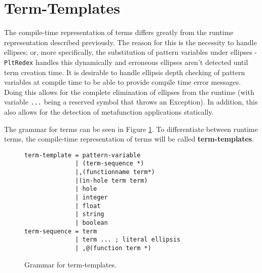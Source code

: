 \section{Term-Templates}
\label{section:term-templates}

The compile-time representation of terms differs greatly from the runtime representation described previously. The reason for this is the necessity to handle ellipses; or, more specifically, the substitution of pattern variables under ellipses - \texttt{PltRedex} handles this dynamically and erroneous ellipses aren't detected until term creation time.
It is desirable to handle ellipsis depth checking of pattern variables at compile time to be able to provide compile time error messages. Doing this allows for the complete elimination of ellipses from the runtime (with variable \texttt{...} being a reserved symbol that throws an Exception). In addition, this also allows for the detection of metafunction applications statically.

The grammar for terms can be seen in Figure \ref{termtemplate-grammar}. To differentiate between runtime terms, the compile-time representation of terms will be called \textbf{term-templates}.

\begin{figure}
\begin{verbatim}
term-template = pattern-variable
              | (term-sequence *)
              |,(functionname term*)
              |(in-hole term term)
              | hole
              | integer
              | float
              | string
              | boolean
term-sequence = term
              | term ... ; literal ellipsis
              | ,@(function term *)
\end{verbatim}
\caption{Grammar for term-templates.}
\label{termtemplate-grammar}
\end{figure}


